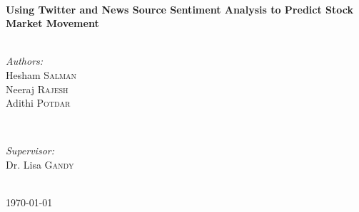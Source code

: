 \begin{titlepage}
\HRule \\[0.4cm]
{ \huge \bfseries Using Twitter and News Source Sentiment Analysis to Predict Stock Market Movement}\\[0.4cm] %
\HRule \\[1.5cm]
 

\begin{minipage}{0.4\textwidth}
\begin{flushleft} \large
\emph{Authors:}\\
Hesham \textsc{Salman}\\ %
Neeraj \textsc{Rajesh}\\
Adithi \textsc{Potdar}
\end{flushleft}
\end{minipage}
~
\begin{minipage}{0.4\textwidth}
\begin{flushright} \large
\vspace*{-1.2cm}
\emph{Supervisor:} \\
Dr. Lisa \textsc{Gandy}%
\end{flushright}
\end{minipage}\\[2cm]



{\large \today}\\[2cm] %
\vfill %

\end{titlepage}


